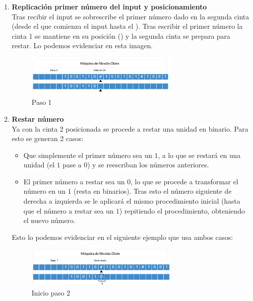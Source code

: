 \documentclass[12pt]{article}
\begin{document}
\begin{enumerate}
\item \textbf{Replicación primer número del input y posicionamiento} \vspace{0.2cm}\\
    Tras recibir el input se sobrescribe el primer número dado en la segunda cinta (desde el que comienza el input hasta el \text{\#} ). Tras escribir el primer número la cinta 1 se mantiene en su posición (\text{\#}) y la segunda cinta se prepara para restar. Lo podemos evidenciar en esta imagen.\\
    \begin{figure}
        \includegraphics[width=0.7\textwidth]{imagenes/PASO 1.JPG}
        \centering
        \caption{Paso 1}
        \label{fig:paso1}
    \end{figure}
\newpage

\item \textbf{Restar número} \vspace{0.2cm}\\
    Ya con la cinta 2 posicionada se procede a restar una unidad en binario. Para esto se generan 2 casos: 
    \begin{itemize}
	    \item Que simplemente el primer número sea un $1$, a lo que se restará en una unidad (el $1$ pase a $0$) y se reescriban los números anteriores.
	    \item El primer número a restar sea un $0$, lo que se procede a transformar el número en un $1$ (resta en binarios). Tras esto el número siguiente de derecha a izquierda se le aplicará el mismo procedimiento inicial (hasta que el número a restar sea un $1$) repitiendo el procedimiento, obteniendo el nuevo número.  
        \end{itemize}
    Esto lo podemos evidenciar en el siguiente ejemplo que usa ambos casos:
     \begin{figure}[h]
        \includegraphics[width=0.7\textwidth]{imagenes/PASO 2.1.jpg}
        \centering
        \caption{Inicio paso 2}
        \label{fig:paso 2.1}
    \end{figure}
    

\end{enumerate}
\end{document}

